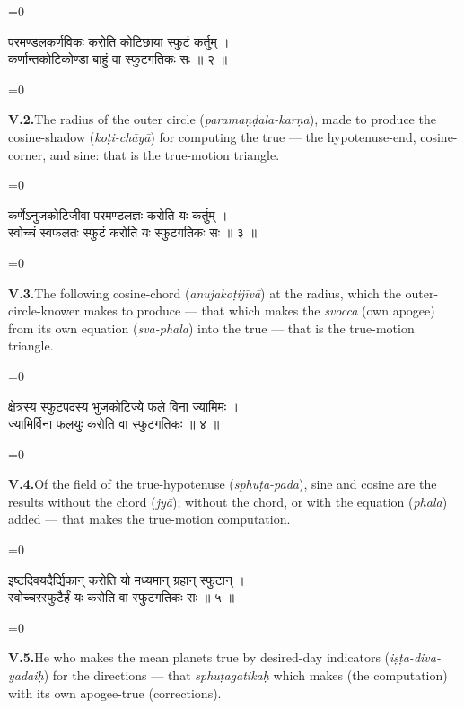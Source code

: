 \documentclass[11pt,a4paper]{article}
\newcommand{\dev}[1]{{\devanagarifont\color{sktcolor}#1}}
\newcommand{\iast}[1]{\textit{#1}}
\newenvironment{paracol}[1]{\begingroup}{\endgroup}
\newcommand{\switchcolumn}[1][]{%
  \ifnum#1=0\relax\else\par\nobreak\vspace{0.5em}\par\nobreak\fi%
}
\begin{document}
\vspace{0.3cm}

\begin{paracol}{2}
\switchcolumn[0]
\dev{%
परमण्डलकर्णविकः करोति कोटिछाया स्फुटं कर्तुम् ।\\
कर्णान्तकोटिकोण्डा बाहुं वा स्फुटगतिकः सः ॥ २ ॥
}

\switchcolumn[1]
\textbf{V.2.}\quad The radius of the outer circle
(\iast{paramaṇḍala-karṇa}), made to produce the cosine-shadow
(\iast{koṭi-chāyā}) for computing the true — the hypotenuse-end,
cosine-corner, and sine: that is the true-motion triangle.
\end{paracol}

\vspace{0.3cm}

\begin{paracol}{2}
\switchcolumn[0]
\dev{%
कर्णेऽनुजकोटिजीवा परमण्डलज्ञः करोति यः कर्तुम् ।\\
स्वोच्चं स्वफलतः स्फुटं करोति यः स्फुटगतिकः सः ॥ ३ ॥
}

\switchcolumn[1]
\textbf{V.3.}\quad The following cosine-chord (\iast{anujakoṭijīvā}) at
the radius, which the outer-circle-knower makes to produce — that
which makes the \iast{svocca} (own apogee) from its own equation
(\iast{sva-phala}) into the true — that is the true-motion triangle.
\end{paracol}

\vspace{0.3cm}

\begin{paracol}{2}
\switchcolumn[0]
\dev{%
क्षेत्रस्य स्फुटपदस्य भुजकोटिज्ये फले विना ज्यामिमः ।\\
ज्यामिर्विना फलयुः करोति वा स्फुटगतिकः ॥ ४ ॥
}

\switchcolumn[1]
\textbf{V.4.}\quad Of the field of the true-hypotenuse
(\iast{sphuṭa-pada}), sine and cosine are the results without the
chord (\iast{jyā}); without the chord, or with the equation
(\iast{phala}) added — that makes the true-motion computation.
\end{paracol}

\vspace{0.3cm}

\begin{paracol}{2}
\switchcolumn[0]
\dev{%
इष्टदिवयदैर्द्यिकान् करोति यो मध्यमान् ग्रहान् स्फुटान् ।\\
स्वोच्चरस्फुटैर्हं यः करोति वा स्फुटगतिकः सः ॥ ५ ॥
}

\switchcolumn[1]
\textbf{V.5.}\quad He who makes the mean planets true by desired-day
indicators (\iast{iṣṭa-diva-yadaiḥ}) for the directions — that
\iast{sphuṭagatikaḥ} which makes (the computation) with its own
apogee-true (corrections).
\end{paracol}
\end{document}
